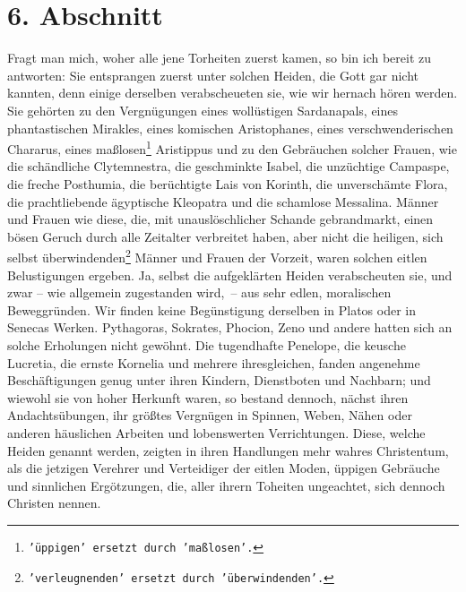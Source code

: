 \section{6. Abschnitt} \label{kap17_ab6}

Fragt man mich, woher alle jene Torheiten zuerst kamen, so bin ich bereit zu
antworten: Sie entsprangen zuerst unter solchen Heiden, die Gott gar nicht
kannten, denn einige derselben verabscheueten sie, wie wir hernach hören werden.
Sie gehörten zu den Vergnügungen eines wollüstigen
Sardanapals, eines
phantastischen Mirakles, eines komischen
Aristophanes, eines verschwenderischen
Chararus, eines maßlosen\footnote{\texttt{'üppigen'
ersetzt durch 'maßlosen'.}}
Aristippus und zu den Gebräuchen solcher Frauen, wie
die
schändliche Clytemnestra, die geschminkte
Isabel, die unzüchtige
Campaspe, die
freche Posthumia, die berüchtigte Lais von
Korinth, die unverschämte Flora, die
prachtliebende ägyptische Kleopatra und die schamlose
Messalina. Männer und
Frauen wie diese, die, mit unauslöschlicher Schande gebrandmarkt, einen bösen
Geruch durch alle Zeitalter verbreitet haben, aber nicht die heiligen, sich
selbst überwindenden\footnote{\texttt{'verleugnenden' ersetzt durch
'überwindenden'.}} Männer und
Frauen der Vorzeit, waren solchen eitlen
Belustigungen ergeben. Ja, selbst die aufgeklärten
Heiden verabscheuten sie,
und zwar -- wie allgemein zugestanden wird,~-- aus sehr edlen, moralischen
Beweggründen. Wir finden keine Begünstigung derselben in
Platos oder in
Senecas Werken. Pythagoras,
Sokrates, Phocion,
Zeno und andere hatten sich an
solche Erholungen nicht gewöhnt. Die tugendhafte
Penelope, die keusche
Lucretia, die ernste
Kornelia und mehrere ihresgleichen, fanden angenehme
Beschäftigungen genug unter ihren Kindern, Dienstboten und Nachbarn; und wiewohl
sie von hoher Herkunft waren, so bestand dennoch, nächst ihren Andachtsübungen,
ihr größtes Vergnügen in Spinnen, Weben, Nähen oder anderen häuslichen Arbeiten
und lobenswerten Verrichtungen. Diese, welche Heiden genannt werden, zeigten
in ihren Handlungen mehr wahres Christentum, als die jetzigen Verehrer und
Verteidiger der eitlen Moden, üppigen Gebräuche und sinnlichen Ergötzungen,
die, aller ihrern Toheiten ungeachtet, sich dennoch Christen nennen.

